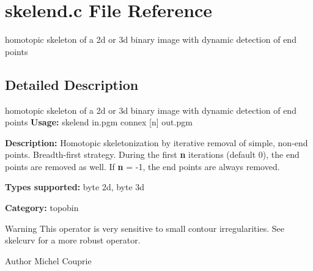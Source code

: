 \section{skelend.c File Reference}
\label{skelend_8c}


homotopic skeleton of a 2d or 3d binary image with dynamic detection of end points  




\subsection{Detailed Description}
homotopic skeleton of a 2d or 3d binary image with dynamic detection of end points {\bfseries Usage:} skelend in.pgm connex [n] out.pgm

{\bfseries Description:} Homotopic skeletonization by iterative removal of simple, non-\/end points. Breadth-\/first strategy. During the first {\bfseries n} iterations (default 0), the end points are removed as well. If {\bfseries n} = -\/1, the end points are always removed.

{\bfseries Types supported:} byte 2d, byte 3d

{\bfseries Category:} topobin

\begin{DoxyWarning}{Warning}
This operator is very sensitive to small contour irregularities. See skelcurv for a more robust operator.
\end{DoxyWarning}
\begin{DoxyAuthor}{Author}
Michel Couprie 
\end{DoxyAuthor}
